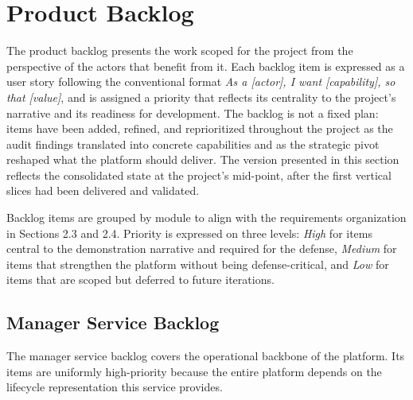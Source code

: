\section{Product Backlog}
The product backlog presents the work scoped for the project from the perspective of the actors that benefit from it. Each backlog item is expressed as a user story following the conventional format \textit{As a [actor], I want [capability], so that [value]}, and is assigned a priority that reflects its centrality to the project's narrative and its readiness for development. The backlog is not a fixed plan: items have been added, refined, and reprioritized throughout the project as the audit findings translated into concrete capabilities and as the strategic pivot reshaped what the platform should deliver. The version presented in this section reflects the consolidated state at the project's mid-point, after the first vertical slices had been delivered and validated.

Backlog items are grouped by module to align with the requirements organization in Sections 2.3 and 2.4. Priority is expressed on three levels: \textit{High} for items central to the demonstration narrative and required for the defense, \textit{Medium} for items that strengthen the platform without being defense-critical, and \textit{Low} for items that are scoped but deferred to future iterations.

\subsection*{Manager Service Backlog}
The manager service backlog covers the operational backbone of the platform. Its items are uniformly high-priority because the entire platform depends on the lifecycle representation this service provides.

